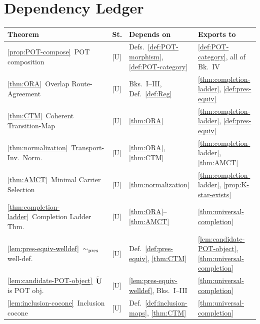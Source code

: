 \documentclass[12pt,oneside]{amsbook}
\theoremstyle{plain}
\theoremstyle{definition}
\theoremstyle{remark}
\begin{document}
\section{Dependency Ledger}

\renewcommand{\arraystretch}{1.4}
\noindent
\begin{tabular}{@{}p{4.2cm}p{0.8cm}p{3.4cm}p{4.6cm}@{}}
\hline
\textbf{Theorem} & \textbf{St.} & \textbf{Depends on} & \textbf{Exports to} \\
\hline
\ref{prop:POT-compose}\ POT composition
  & [U] & Defs.~\ref{def:POT-morphism}, \ref{def:POT-category}
  & \ref{def:POT-category}, all of Bk.~IV \\

\ref{thm:ORA}\ Overlap Route-Agreement
  & [U] & Bks.~I--III, Def.~\ref{def:Reg}
  & \ref{thm:completion-ladder}, \ref{def:pres-equiv} \\

\ref{thm:CTM}\ Coherent Transition-Map
  & [U] & \ref{thm:ORA}
  & \ref{thm:completion-ladder}, \ref{def:pres-equiv} \\

\ref{thm:normalization}\ Transport-Inv.\ Norm.
  & [U] & \ref{thm:ORA}, \ref{thm:CTM}
  & \ref{thm:completion-ladder}, \ref{thm:AMCT} \\

\ref{thm:AMCT}\ Minimal Carrier Selection
  & [U] & \ref{thm:normalization}
  & \ref{thm:completion-ladder}, \ref{prop:K-star-exists} \\

\ref{thm:completion-ladder}\ Completion Ladder Thm.
  & [U] & \ref{thm:ORA}--\ref{thm:AMCT}
  & \ref{thm:universal-completion} \\

\ref{lem:pres-equiv-welldef}\ $\sim_{\rm pres}$ well-def.
  & [U] & Def.~\ref{def:pres-equiv}, \ref{thm:CTM}
  & \ref{lem:candidate-POT-object}, \ref{thm:universal-completion} \\

\ref{lem:candidate-POT-object}\ $\widetilde{\mathbf{U}}$ is POT obj.
  & [U] & \ref{lem:pres-equiv-welldef}, Bks.~I--III
  & \ref{thm:universal-completion} \\

\ref{lem:inclusion-cocone}\ Inclusion cocone
  & [U] & Def.~\ref{def:inclusion-maps}, \ref{thm:CTM}
  & \ref{thm:universal-completion} \\


\end{tabular}
\end{document}
